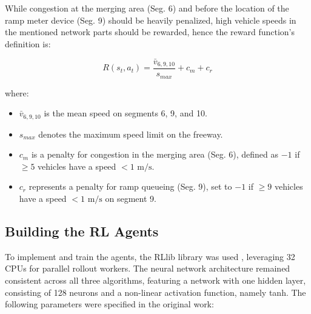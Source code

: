While congestion at the merging area (Seg. 6) and before the location of the ramp meter device (Seg. 9) should be heavily penalized, high vehicle speeds
in the mentioned network parts should be rewarded, hence the reward function's definition is:

\begin{equation}
    R(s_t, a_t) = \frac{\bar{v}_{6,9,10}}{s_{max}} + c_m + c_r
\end{equation}

where:
\begin{itemize}
    \item $\bar{v}_{6,9,10}$ is the mean speed on segments 6, 9, and 10.
    \item $s_{max}$ denotes the maximum speed limit on the freeway.
    \item $c_m$ is a penalty for congestion in the merging area (Seg. 6), defined as $-1$ if $\ge 5$ vehicles have a speed $< 1 \text{ m/s}$.
    \item $c_r$ represents a penalty for ramp queueing (Seg. 9), set to $-1$ if $\ge 9$ vehicles have a speed $< 1 \text{ m/s}$ on segment 9.
\end{itemize}



\subsection{Building the RL Agents}

To implement and train the agents, the RLlib library was used \cite{liang2018rllib}, leveraging 32 CPUs for parallel rollout workers. 
The neural network architecture remained consistent across all three algorithms, featuring a network with one hidden layer, consisting of 128 neurons and a non-linear activation function, namely tanh. 
The following parameters were specified in the original work:  


